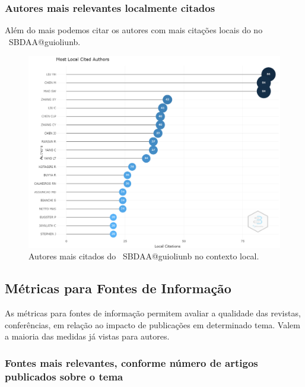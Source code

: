 \subsubsection{Autores mais relevantes localmente citados}

Além do mais podemos citar os autores com mais citações locais do no \dataset\ SBDAA@guioliunb.

\begin{figure}
    \centering
    \includegraphics[width=1\textwidth]{experiments/guioliunb/AnaliseBibliometrica/SocialBigDataAnalysis/MOST LOAL CITED AUTHORS.png}
    \caption{Autores mais citados do \dataset\ SBDAA@guioliunb no contexto local.}
    \label{fig:authors:production}
\end{figure}


\subsection{Métricas para Fontes de Informação}

As métricas para fontes de informação permitem avaliar a qualidade das revistas, conferências, em relação ao impacto de publicações em determinado tema. Valem a maioria das medidas já vistas para autores.

\subsubsection{Fontes mais relevantes, conforme número de artigos publicados sobre o tema}

